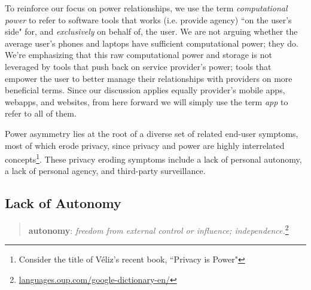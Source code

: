 \documentclass[11pt, oneside]{article}   	%
\newcommand{\hyperfootnote}[1][]{\def\ArgI{{#1}}\hyperfootnoteRelay}
\newcommand\hyperfootnoteRelay[2][]{\href{#1#2}{\ArgI}\footnote{\href{#1#2}{#2}}}
\begin{document}
To reinforce our focus on power relationships, we use the term \emph{computational power} to refer to software tools that works (i.e. provide agency) ``on the user's side" for, and \emph{exclusively} on behalf of, the user. We are not arguing whether the average user's phones and laptops have sufficient computational power; they do. We're emphasizing that this raw computational power and storage is not leveraged by tools that push back on service provider's power; tools that empower the user to better manage their relationships with providers on more beneficial terms. Since our discussion applies equally provider's mobile apps, webapps, and websites, from here forward we will simply use the term \emph{app} to refer to all of them.

Power asymmetry lies at the root of a diverse set of related end-user symptoms, most of which erode privacy, since privacy and power are highly interrelated concepts\footnote{Consider the title of V\'eliz's recent book, ``Privacy is Power"\cite{veliz2020}}. 
These privacy eroding symptoms include a lack of personal autonomy, a lack of personal agency, and third-party surveillance. 

\subsection{Lack of Autonomy}

\begin{quote}
\textbf{au\hspace{0.5mm}\tiny {}\normalsize \hspace{0.5mm}ton\hspace{0.5mm}\tiny {}\normalsize \hspace{0.5mm}o\hspace{0.5mm}\tiny {}\normalsize \hspace{0.5mm}my}: \emph{freedom from external control or influence; independence.}\hyperfootnote[][https://]{languages.oup.com/google-dictionary-en/}
\end{quote}
\end{document}
